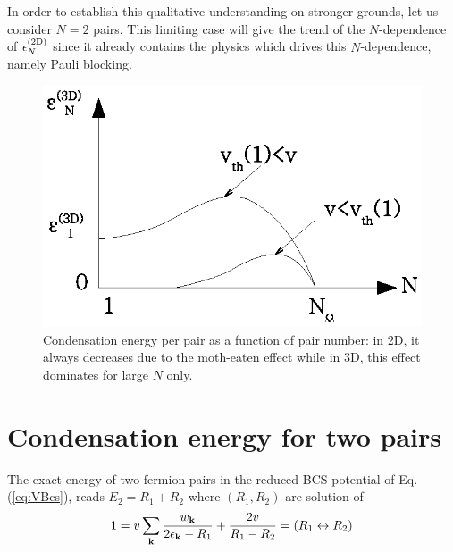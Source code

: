 \documentclass[5p,twocolumn]{elsarticle}
\begin{document}
In order to establish this qualitative understanding on stronger  grounds, let us consider $N=2$ pairs. This limiting case will give the trend of the $N$-dependence of $\epsilon^{{\text{(2D)}}}_N$ since it already contains the physics which drives this $N$-dependence, namely Pauli blocking.  

\begin{figure}[htb]
	\centering
		\includegraphics[width=0.8\columnwidth]{3dCondChange.eps}
	\caption{Condensation energy per pair as a function of pair number: in 2D, it always decreases due to the moth-eaten effect while in 3D, this effect dominates for large $N$ only.}
	\label{fig:3dCondChange}
\end{figure}

\section{Condensation energy for two pairs\label{sec:twoPair}}
The exact energy of two fermion pairs in the reduced BCS potential of Eq. (\ref{eq:VBcs}), reads $E_2=R_1+R_2$ where $(R_1,R_2)$ are solution of
\begin{equation}
1=v\sum_{\mathbf{k}}\frac{w_{\mathbf{k}}}{2\epsilon_{\mathbf{k}}-R_1}+\frac{2v}{R_1-R_2}=(R_{1}\leftrightarrow{}R_{2})
\label{eq:richardsonEq}
\end{equation}
\end{document}
